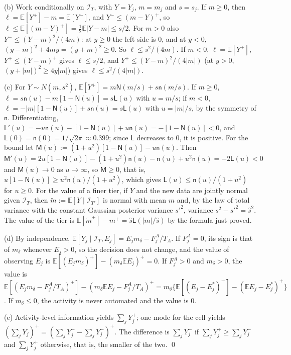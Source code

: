 (b) Work conditionally on $\mathcal I_T$, with $Y=Y_j$, $m=m_j$ and $s=s_j$. If $m\ge 0$, then $\ell=\mathbb E[Y^+]-m=\mathbb E[Y^-]$, and $Y^-\le(m-Y)^+$, so $\ell\le\mathbb E[(m-Y)^+]=\tfrac12\mathbb E|Y-m|\le s/2$. For $m>0$ also $Y^-\le(Y-m)^2/(4m)$: at $y\ge 0$ the left side is $0$, and at $y<0$, $(y-m)^2+4my=(y+m)^2\ge 0$. So $\ell\le s^2/(4m)$. If $m<0$, $\ell=\mathbb E[Y^+]$, $Y^+\le(Y-m)^+$ gives $\ell\le s/2$, and $Y^+\le(Y-m)^2/(4|m|)$ (at $y>0$, $(y+|m|)^2\ge 4y|m|$) gives $\ell\le s^2/(4|m|)$.

(c) For $Y\sim N(m,s^2)$, $\mathbb E[Y^+]=m\mathsf N(m/s)+s\mathsf n(m/s)$. If $m\ge 0$, $\ell=s\mathsf n(u)-m[1-\mathsf N(u)]=s\mathsf L(u)$ with $u=m/s$; if $m<0$, $\ell=-|m|[1-\mathsf N(u)]+s\mathsf n(u)=s\mathsf L(u)$ with $u=|m|/s$, by the symmetry of $\mathsf n$. Differentiating, $\mathsf L'(u)=-u\mathsf n(u)-[1-\mathsf N(u)]+u\mathsf n(u)=-[1-\mathsf N(u)]<0$, and $\mathsf L(0)=\mathsf n(0)=1/\sqrt{2\pi}\approx 0.399$; since $\mathsf L$ decreases to $0$, it is positive. For the bound let $\mathsf M(u):=(1+u^2)[1-\mathsf N(u)]-u\mathsf n(u)$. Then $\mathsf M'(u)=2u[1-\mathsf N(u)]-(1+u^2)\mathsf n(u)-\mathsf n(u)+u^2\mathsf n(u)=-2\mathsf L(u)<0$ and $\mathsf M(u)\to 0$ as $u\to\infty$, so $\mathsf M\ge 0$, that is, $u[1-\mathsf N(u)]\ge u^2\mathsf n(u)/(1+u^2)$, which gives $\mathsf L(u)\le\mathsf n(u)/(1+u^2)$ for $u\ge 0$. For the value of a finer tier, if $Y$ and the new data are jointly normal given $\mathcal I_T$, then $\tilde m:=\mathbb E[Y\mid\mathcal I_{T'}]$ is normal with mean $m$ and, by the law of total variance with the constant Gaussian posterior variance $s'^2$, variance $s^2-s'^2=\hat s^2$. The value of the tier is $\mathbb E[\tilde m^+]-m^+=\hat s\mathsf L(|m|/\hat s)$ by the formula just proved.

(d) By independence, $\mathbb E[Y_j\mid\mathcal I_T,E_j]=E_jm_\delta-F^A_j/T_A$. If $F^A_j=0$, its sign is that of $m_\delta$ whenever $E_j>0$, so the decision does not change, and the value of observing $E_j$ is $\mathbb E[(E_jm_\delta)^+]-(m_\delta\mathbb EE_j)^+=0$. If $F^A_j>0$ and $m_\delta>0$, the value is $\mathbb E[(E_jm_\delta-F^A_j/T_A)^+]-(m_\delta\mathbb EE_j-F^A_j/T_A)^+=m_\delta\{\mathbb E[(E_j-E^*_j)^+]-(\mathbb EE_j-E^*_j)^+\}$. If $m_\delta\le 0$, the activity is never automated and the value is $0$.

(e) Activity-level information yields $\sum_jY_j^+$; one mode for the cell yields $(\sum_jY_j)^+=(\sum_jY_j^+-\sum_jY_j^-)^+$. The difference is $\sum_jY_j^-$ if $\sum_jY_j^+\ge\sum_jY_j^-$ and $\sum_jY_j^+$ otherwise, that is, the smaller of the two. \qed

